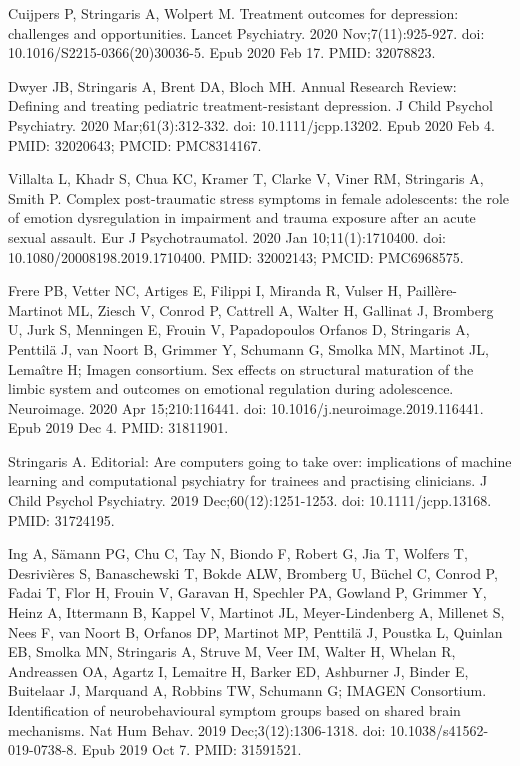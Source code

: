 \documentclass[
]{article}
\begin{document}
Cuijpers P, Stringaris A, Wolpert M. Treatment outcomes for depression:
challenges and opportunities. Lancet Psychiatry. 2020 Nov;7(11):925-927.
doi: 10.1016/S2215-0366(20)30036-5. Epub 2020 Feb 17. PMID: 32078823.

Dwyer JB, Stringaris A, Brent DA, Bloch MH. Annual Research Review:
Defining and treating pediatric treatment-resistant depression. J Child
Psychol Psychiatry. 2020 Mar;61(3):312-332. doi: 10.1111/jcpp.13202.
Epub 2020 Feb 4. PMID: 32020643; PMCID: PMC8314167.

Villalta L, Khadr S, Chua KC, Kramer T, Clarke V, Viner RM, Stringaris
A, Smith P. Complex post-traumatic stress symptoms in female
adolescents: the role of emotion dysregulation in impairment and trauma
exposure after an acute sexual assault. Eur J Psychotraumatol. 2020 Jan
10;11(1):1710400. doi: 10.1080/20008198.2019.1710400. PMID: 32002143;
PMCID: PMC6968575.

Frere PB, Vetter NC, Artiges E, Filippi I, Miranda R, Vulser H,
Paillère- Martinot ML, Ziesch V, Conrod P, Cattrell A, Walter H,
Gallinat J, Bromberg U, Jurk S, Menningen E, Frouin V, Papadopoulos
Orfanos D, Stringaris A, Penttilä J, van Noort B, Grimmer Y, Schumann G,
Smolka MN, Martinot JL, Lemaître H; Imagen consortium. Sex effects on
structural maturation of the limbic system and outcomes on emotional
regulation during adolescence. Neuroimage. 2020 Apr 15;210:116441. doi:
10.1016/j.neuroimage.2019.116441. Epub 2019 Dec 4. PMID: 31811901.

Stringaris A. Editorial: Are computers going to take over: implications
of machine learning and computational psychiatry for trainees and
practising clinicians. J Child Psychol Psychiatry. 2019
Dec;60(12):1251-1253. doi: 10.1111/jcpp.13168. PMID: 31724195.

Ing A, Sämann PG, Chu C, Tay N, Biondo F, Robert G, Jia T, Wolfers T,
Desrivières S, Banaschewski T, Bokde ALW, Bromberg U, Büchel C, Conrod
P, Fadai T, Flor H, Frouin V, Garavan H, Spechler PA, Gowland P, Grimmer
Y, Heinz A, Ittermann B, Kappel V, Martinot JL, Meyer-Lindenberg A,
Millenet S, Nees F, van Noort B, Orfanos DP, Martinot MP, Penttilä J,
Poustka L, Quinlan EB, Smolka MN, Stringaris A, Struve M, Veer IM,
Walter H, Whelan R, Andreassen OA, Agartz I, Lemaitre H, Barker ED,
Ashburner J, Binder E, Buitelaar J, Marquand A, Robbins TW, Schumann G;
IMAGEN Consortium. Identification of neurobehavioural symptom groups
based on shared brain mechanisms. Nat Hum Behav. 2019
Dec;3(12):1306-1318. doi: 10.1038/s41562-019-0738-8. Epub 2019 Oct 7.
PMID: 31591521.
\end{document}
